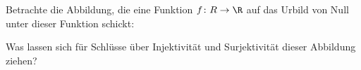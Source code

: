 \begin{exercise}
  Betrachte die Abbildung, die eine Funktion $f \colon R \to \R$ auf das
  Urbild von Null unter dieser Funktion schickt:
  \begin{center}
  \end{center}
  Was lassen sich für Schlüsse über Injektivität und Surjektivität dieser
  Abbildung ziehen?
\end{exercise}
